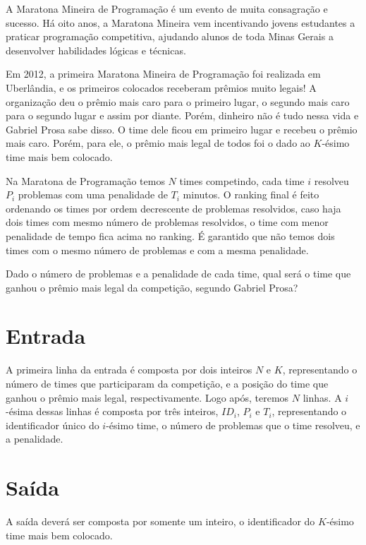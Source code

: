 %

A Maratona Mineira de Programação é um evento de muita consagração e sucesso. Há oito anos, a Maratona Mineira vem incentivando jovens estudantes a praticar programação competitiva, ajudando alunos de toda Minas Gerais a desenvolver habilidades lógicas e técnicas.

Em 2012, a primeira Maratona Mineira de Programação foi realizada em Uberlândia, e os primeiros colocados receberam prêmios muito legais! A organização deu o prêmio mais caro para o primeiro lugar, o segundo mais caro para o segundo lugar e assim por diante. Porém, dinheiro não é tudo nessa vida e Gabriel Prosa sabe disso. O time dele ficou em primeiro lugar e recebeu o prêmio mais caro. Porém, para ele, o prêmio mais legal de todos foi o dado ao $K$-ésimo time mais bem colocado.

Na Maratona de Programação temos $N$ times competindo, cada time $i$ resolveu $P_i$ problemas com uma penalidade de $T_i$ minutos. O ranking final é feito ordenando os times por ordem decrescente de problemas resolvidos, caso haja dois times com mesmo número de problemas resolvidos, o time com menor penalidade de tempo fica acima no ranking. É garantido que não temos dois times com o mesmo número de problemas e com a mesma penalidade.

Dado o número de problemas e a penalidade de cada time, qual será o time que ganhou o prêmio mais legal da competição, segundo Gabriel Prosa?


\section*{Entrada}
A primeira linha da entrada é composta por dois inteiros $N$ e $K$, representando o número de times que participaram da competição, e a posição do time que ganhou o prêmio mais legal, respectivamente. Logo após, teremos $N$ linhas.
A $i$-ésima dessas linhas é composta por três inteiros, $ID_i$, $P_i$ e $T_i$, representando o identificador único do $i$-ésimo time, o número de problemas que o time resolveu, e a penalidade.


\section*{Saída}
A saída deverá ser composta por somente um inteiro, o identificador do $K$-ésimo time mais bem colocado.


